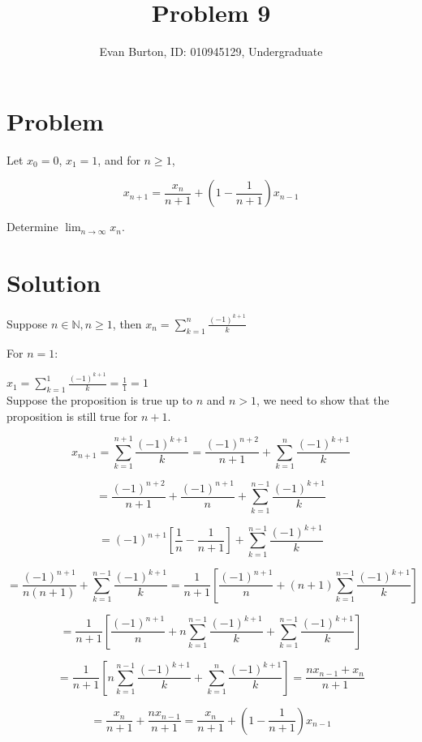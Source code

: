 \documentclass[]{article}
\title{Problem 9}
\author{Evan Burton, ID: 010945129, Undergraduate}
\begin{document}
\maketitle

\section{Problem}
Let $x_0 = 0$, $x_1 = 1$, and for $n \geq 1$,

$$x_{n+1} =\frac{x_n}{n+1} + (1 - \frac{1}{n+1})x_{n-1}$$  

Determine $\displaystyle{\lim_{n \rightarrow \infty}} x_n$.
   
\section{Solution}
Suppose $n \in \mathbb{N}, n \geq 1$, then $x_n = \displaystyle{\sum_{k=1}^{n} \frac{(-1)^{k+1}}{k}}$

For $n = 1$:

$x_1 = \displaystyle{\sum_{k=1}^{1} \frac{(-1)^{k+1}}{k}} = \frac{1}{1} = 1$\\

Suppose the proposition is true up to $n$ and $n > 1$, we need to show that the proposition is still true for $n+1$.

$$x_{n+1} = \displaystyle{\sum_{k=1}^{n+1} \frac{(-1)^{k+1}}{k}} = 
\frac{(-1)^{n+2}}{n+1} + \displaystyle{\sum_{k=1}^{n} \frac{(-1)^{k+1}}{k}}
$$

$$=
\frac{(-1)^{n+2}}{n+1} + \frac{(-1)^{n+1}}{n} + \displaystyle{\sum_{k=1}^{n-1} \frac{(-1)^{k+1}}{k}}
$$

$$=
(-1)^{n+1}\left[\frac{1}{n} - \frac{1}{n+1}\right] + \displaystyle{\sum_{k=1}^{n-1} \frac{(-1)^{k+1}}{k}}
$$

$$=
\frac{(-1)^{n+1}}{n(n+1)}+\displaystyle{\sum_{k=1}^{n-1} \frac{(-1)^{k+1}}{k}}
=
\frac{1}{n+1}\left[\frac{(-1)^{n+1}}{n}+{(n+1)}\displaystyle{\sum_{k=1}^{n-1} \frac{(-1)^{k+1}}{k}}\right]
$$

$$=
\frac{1}{n+1}\left[\frac{(-1)^{n+1}}{n}+n\displaystyle{\sum_{k=1}^{n-1} \frac{(-1)^{k+1}}{k}}+\displaystyle{\sum_{k=1}^{n-1} \frac{(-1)^{k+1}}{k}}\right]
$$

$$=
\frac{1}{n+1}\left[n\displaystyle{\sum_{k=1}^{n-1} \frac{(-1)^{k+1}}{k}}+\displaystyle{\sum_{k=1}^{n} \frac{(-1)^{k+1}}{k}}\right] = \frac{nx_{n-1} +x_n}{n+1}
$$

$$=
\frac{x_n}{n+1} + \frac{nx_{n-1}}{n+1}
=
\frac{x_n}{n+1} + \left(1 - \frac{1}{n+1}\right)x_{n-1}
$$
\end{document}
